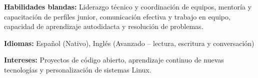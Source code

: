 \documentclass[10pt,a4paper]{article}
\begin{document}
\vspace{1.5pt}
\textbf{Habilidades blandas:} Liderazgo técnico y coordinación de equipos, mentoría y capacitación de perfiles junior, comunicación efectiva y trabajo en equipo, capacidad de aprendizaje autodidacta y resolución de problemas.

\vspace{1.5pt}
\textbf{Idiomas:} Español (Nativo), Inglés (Avanzado -- lectura, escritura y conversación)

\vspace{1.5pt}
\textbf{Intereses:} Proyectos de código abierto, aprendizaje continuo de nuevas tecnologías y personalización de sistemas Linux.
\end{document}
